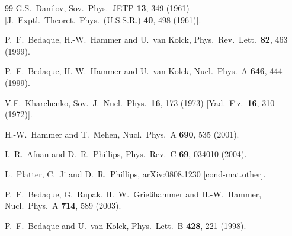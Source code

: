 \documentclass[aps,rmp,nofootinbib,twocolumn,floatfix]{revtex4}
\begin{document}
\begin{thebibliography}{99}
G.S.~Danilov, 
Sov.\ Phys.\ JETP {\bf 13}, 349 (1961)
        [J.\ Exptl.\ Theoret.\ Phys.\ (U.S.S.R.) {\bf 40}, 498 (1961)].


  P.~F.~Bedaque, H.-W.~Hammer and U.~van Kolck,
  Phys.\ Rev.\ Lett.\  {\bf 82}, 463 (1999).

  P.~F.~Bedaque, H.-W.~Hammer and U.~van Kolck,
  Nucl.\ Phys.\  A {\bf 646}, 444 (1999).

V.F.~Kharchenko,
Sov.\ J.\ Nucl.\ Phys.\ {\bf 16}, 173 (1973)
        [Yad.\ Fiz.\ {\bf 16}, 310 (1972)].


  H.-W.~Hammer and T.~Mehen,
  Nucl.\ Phys.\  A {\bf 690}, 535 (2001).

  I.~R.~Afnan and D.~R.~Phillips,
  Phys.\ Rev.\  C {\bf 69}, 034010 (2004).

  L.~Platter, C.~Ji and D.~R.~Phillips,
  arXiv:0808.1230 [cond-mat.other].

  P.~F.~Bedaque, G.~Rupak, H.~W.~Grie{\ss}hammer and H.-W.~Hammer,
  Nucl.\ Phys.\  A {\bf 714}, 589 (2003).

  P.~F.~Bedaque and U.~van Kolck,
  Phys.\ Lett.\  B {\bf 428}, 221 (1998).


\end{thebibliography}
\end{document}
